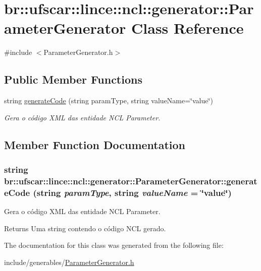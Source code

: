 \hypertarget{classbr_1_1ufscar_1_1lince_1_1ncl_1_1generator_1_1ParameterGenerator}{
\section{br::ufscar::lince::ncl::generator::ParameterGenerator Class Reference}
\label{classbr_1_1ufscar_1_1lince_1_1ncl_1_1generator_1_1ParameterGenerator}
}


{\ttfamily \#include $<$ParameterGenerator.h$>$}

\subsection*{Public Member Functions}
\begin{DoxyCompactItemize}
\item 
string \hyperlink{classbr_1_1ufscar_1_1lince_1_1ncl_1_1generator_1_1ParameterGenerator_aaf5721c55d193d39dc823c6cac1a95ef}{generateCode} (string paramType, string valueName=\char`\"{}value\char`\"{})
\begin{DoxyCompactList}\small\item\em Gera o código XML das entidade NCL Parameter. \item\end{DoxyCompactList}\end{DoxyCompactItemize}


\subsection{Member Function Documentation}
\hypertarget{classbr_1_1ufscar_1_1lince_1_1ncl_1_1generator_1_1ParameterGenerator_aaf5721c55d193d39dc823c6cac1a95ef}{
\subsubsection[{generateCode}]{\setlength{\rightskip}{0pt plus 5cm}string br::ufscar::lince::ncl::generator::ParameterGenerator::generateCode (string {\em paramType}, \/  string {\em valueName} = {\ttfamily \char`\"{}value\char`\"{}})}}
\label{classbr_1_1ufscar_1_1lince_1_1ncl_1_1generator_1_1ParameterGenerator_aaf5721c55d193d39dc823c6cac1a95ef}


Gera o código XML das entidade NCL Parameter. 

\begin{DoxyReturn}{Returns}
Uma string contendo o código NCL gerado. 
\end{DoxyReturn}


The documentation for this class was generated from the following file:\begin{DoxyCompactItemize}
\item 
include/generables/\hyperlink{ParameterGenerator_8h}{ParameterGenerator.h}\end{DoxyCompactItemize}
